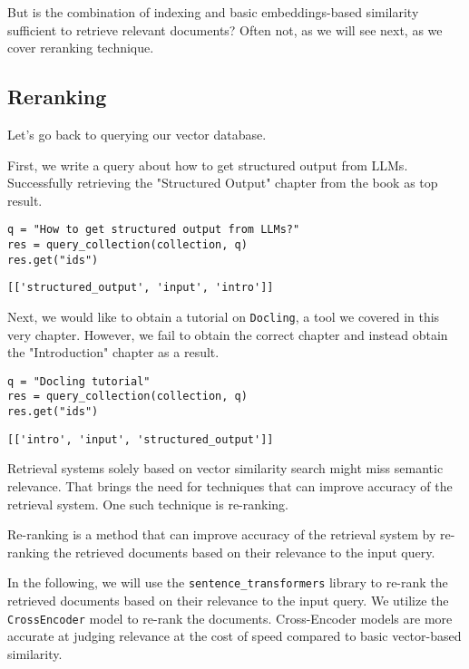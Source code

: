 But is the combination of indexing and basic embeddings-based similarity sufficient to retrieve relevant documents? Often not, as we will see next, as we cover reranking technique.

\subsection{Reranking}

Let's go back to querying our vector database.

First, we write a query about how to get structured output from LLMs. Successfully retrieving the "Structured Output" chapter from the book as top result.

\begin{verbatim}
q = "How to get structured output from LLMs?"
res = query_collection(collection, q)
res.get("ids")
\end{verbatim}

\begin{verbatim}
[['structured_output', 'input', 'intro']]
\end{verbatim}

Next, we would like to obtain a tutorial on \texttt{Docling}, a tool we covered in this very chapter. However, we fail to obtain the correct chapter and instead obtain the "Introduction" chapter as a result.

\begin{verbatim}
q = "Docling tutorial"
res = query_collection(collection, q)
res.get("ids")
\end{verbatim}

\begin{verbatim}
[['intro', 'input', 'structured_output']]
\end{verbatim}

Retrieval systems solely based on vector similarity search might miss semantic relevance. That brings the need for techniques that can improve accuracy of the retrieval system. One such technique is re-ranking.

Re-ranking is a method that can improve accuracy of the retrieval system by re-ranking the retrieved documents based on their relevance to the input query.

In the following, we will use the \texttt{sentence\_transformers} library to re-rank the retrieved documents based on their relevance to the input query. We utilize the \texttt{CrossEncoder} model to re-rank the documents. Cross-Encoder models are more accurate at judging relevance at the cost of speed compared to basic vector-based similarity.

